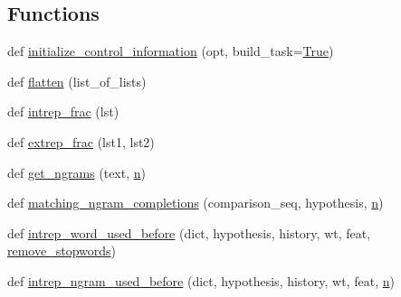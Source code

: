 \subsection*{Functions}
\begin{DoxyCompactItemize}
\item 
def \hyperlink{namespaceprojects_1_1controllable__dialogue_1_1controllable__seq2seq_1_1controls_aafbe257df1791349439cc63c99de8b5e}{initialize\+\_\+control\+\_\+information} (opt, build\+\_\+task=\hyperlink{namespaceprojects_1_1controllable__dialogue_1_1controllable__seq2seq_1_1controls_a2f84d3a62939c36cebd6f2ebcaec08ce}{True})
\item 
def \hyperlink{namespaceprojects_1_1controllable__dialogue_1_1controllable__seq2seq_1_1controls_a0db4b9d9584cef90aa2515a75e741774}{flatten} (list\+\_\+of\+\_\+lists)
\item 
def \hyperlink{namespaceprojects_1_1controllable__dialogue_1_1controllable__seq2seq_1_1controls_a6774bd6ac8941123de4574e69686140a}{intrep\+\_\+frac} (lst)
\item 
def \hyperlink{namespaceprojects_1_1controllable__dialogue_1_1controllable__seq2seq_1_1controls_a24fbafb2553fb93db247bb7e2339b1e4}{extrep\+\_\+frac} (lst1, lst2)
\item 
def \hyperlink{namespaceprojects_1_1controllable__dialogue_1_1controllable__seq2seq_1_1controls_abf6d099074de6b0c663333470eeaa2de}{get\+\_\+ngrams} (text, \hyperlink{namespaceprojects_1_1controllable__dialogue_1_1controllable__seq2seq_1_1controls_a8825ded618f6b3f758fdfc5c4a3bdc71}{n})
\item 
def \hyperlink{namespaceprojects_1_1controllable__dialogue_1_1controllable__seq2seq_1_1controls_ab562827e4a16578079aa8121ebadcda7}{matching\+\_\+ngram\+\_\+completions} (comparison\+\_\+seq, hypothesis, \hyperlink{namespaceprojects_1_1controllable__dialogue_1_1controllable__seq2seq_1_1controls_a8825ded618f6b3f758fdfc5c4a3bdc71}{n})
\item 
def \hyperlink{namespaceprojects_1_1controllable__dialogue_1_1controllable__seq2seq_1_1controls_a42b08e3d8604f6e0b7d88230323cd777}{intrep\+\_\+word\+\_\+used\+\_\+before} (dict, hypothesis, history, wt, feat, \hyperlink{namespaceprojects_1_1controllable__dialogue_1_1controllable__seq2seq_1_1controls_a16bf79fe7e9cbacf6cf5792aaaee4f88}{remove\+\_\+stopwords})
\item 
def \hyperlink{namespaceprojects_1_1controllable__dialogue_1_1controllable__seq2seq_1_1controls_a96e1d28cd5e6769d118b0b8b339213e9}{intrep\+\_\+ngram\+\_\+used\+\_\+before} (dict, hypothesis, history, wt, feat, \hyperlink{namespaceprojects_1_1controllable__dialogue_1_1controllable__seq2seq_1_1controls_a8825ded618f6b3f758fdfc5c4a3bdc71}{n})

\end{DoxyCompactItemize}
